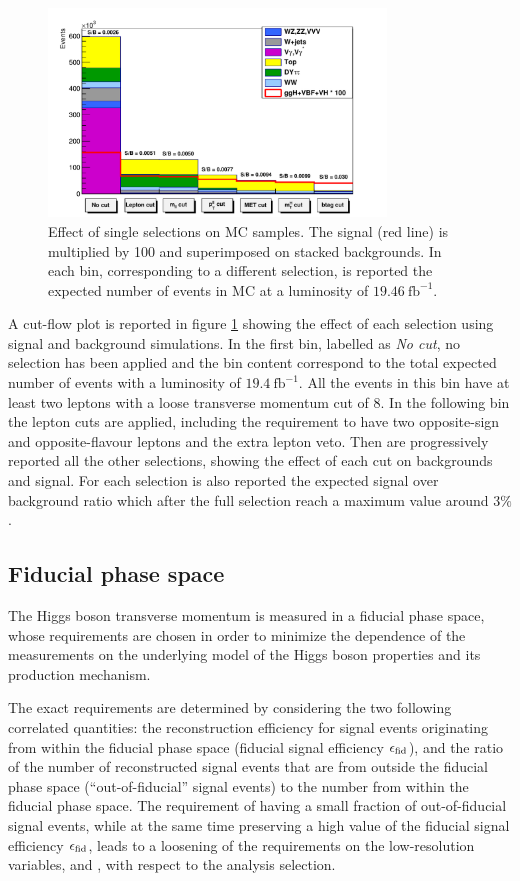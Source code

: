 \begin{figure}[b]
\centering
\includegraphics[width=0.8\textwidth]{images/cutflow2.pdf}
\caption{Effect of single selections on MC samples. The signal (red line) is multiplied by 100 and superimposed on stacked backgrounds. In each bin, corresponding to a different selection, is reported the expected number of events in MC at a luminosity of $19.46~\mathrm{fb}^{-1}$.\label{fig:cutflow}}
\end{figure}

A  cut-flow plot is reported in figure \ref{fig:cutflow} showing the effect of each selection using signal and background simulations. In the first bin, labelled as \textit{No cut}, no selection has been applied and the bin content correspond to the total expected number of events with a luminosity of $19.4~\mathrm{fb}^{-1}$. All the events in this bin have at least two leptons with a loose transverse momentum cut of 8\GeV. In the following bin the lepton cuts are applied, including the requirement to have two opposite-sign and opposite-flavour leptons and the extra lepton veto. Then are progressively reported all the other selections, showing the effect of each cut on backgrounds and signal. For each selection is also reported the expected signal over background ratio which after the full selection reach a maximum value around $3\%$.

\subsection{Fiducial phase space}
The Higgs boson transverse momentum is measured in a fiducial phase space, whose requirements are chosen in order to minimize the dependence of the measurements on the underlying model of the Higgs boson properties and its production mechanism.

The exact requirements are determined by considering the two following correlated quantities: the reconstruction efficiency for signal events originating from within the fiducial phase space (fiducial signal efficiency $\epsilon_{\rm{fid}}$), and the ratio of the number of reconstructed signal events that are from outside the fiducial phase space (``out-of-fiducial'' signal events) to the number from within the fiducial phase space. The requirement of having a small fraction of out-of-fiducial signal events, while at the same time preserving a high value of the fiducial signal efficiency $\epsilon_{\rm{fid}}$, leads to a loosening of the requirements on the low-resolution variables,  \MET and \mt, with respect to the analysis selection.

